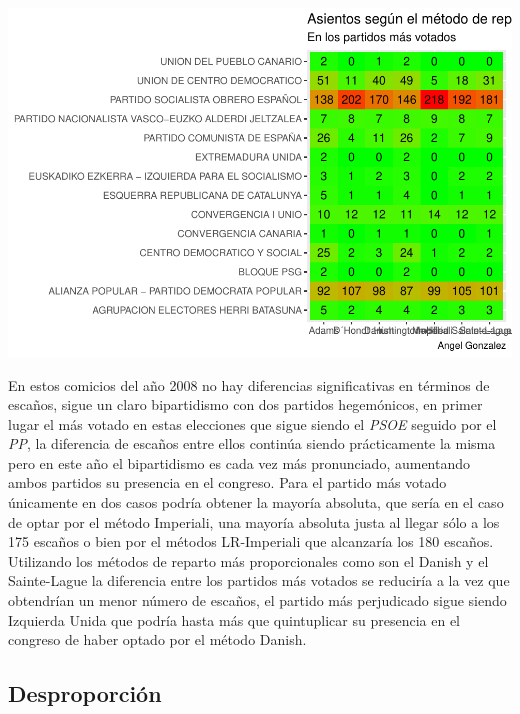 \documentclass[12pt,a4paper,]{book}
\numberwithin{dummy}{section}
\theoremstyle{ocrenumbox}
\theoremstyle{blacknumex}
\theoremstyle{blacknumbox}
\theoremstyle{ocrenum}
\theoremstyle{ocrenum}
\begin{document}
\begin{center}\includegraphics[width=1\linewidth]{figurasR/unnamed-chunk-32-2} \end{center}

En estos comicios del año 2008 no hay diferencias significativas en
términos de escaños, sigue un claro bipartidismo con dos partidos
hegemónicos, en primer lugar el más votado en estas elecciones que sigue
siendo el \emph{PSOE} seguido por el \emph{PP}, la diferencia de escaños
entre ellos continúa siendo prácticamente la misma pero en este año el
bipartidismo es cada vez más pronunciado, aumentando ambos partidos su
presencia en el congreso. Para el partido más votado únicamente en dos
casos podría obtener la mayoría absoluta, que sería en el caso de optar
por el método Imperiali, una mayoría absoluta justa al llegar sólo a los
175 escaños o bien por el métodos LR-Imperiali que alcanzaría los 180
escaños. Utilizando los métodos de reparto más proporcionales como son
el Danish y el Sainte-Lague la diferencia entre los partidos más votados
se reduciría a la vez que obtendrían un menor número de escaños, el
partido más perjudicado sigue siendo Izquierda Unida que podría hasta
más que quintuplicar su presencia en el congreso de haber optado por el
método Danish.

\hypertarget{desproporciuxf3n-9}{%
\subsection{Desproporción}\label{desproporciuxf3n-9}}
\end{document}

